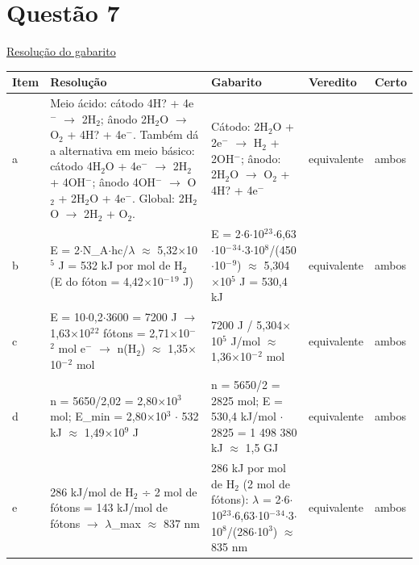 \documentclass{article}%
\begin{document}
\section*{Questão 7}%
\href{https://poliedroresolve.sistemapoliedro.com.br/vestibulares/ita/2026/ita-2-fase-dia-2-29-10-2025-2-fase-dia-2/dissertativa-7-quimica-2-fase-dia-2-ita-2026}{Resolução do gabarito}\par\smallskip%
\begin{longtable}{@{}p{} p{} p{} p{} p{}@{}}\toprule Item & Resolução & Gabarito & Veredito & Certo \\ \midrule
a & Meio ácido: cátodo 4H? + 4e$^{-}$ $\to$ 2H$_{2}$; ânodo 2H$_{2}$O $\to$ O$_{2}$ + 4H? + 4e$^{-}$. Também dá a alternativa em meio básico: cátodo 4H$_{2}$O + 4e$^{-}$ $\to$ 2H$_{2}$ + 4OH$^{-}$; ânodo 4OH$^{-}$ $\to$ O$_{2}$ + 2H$_{2}$O + 4e$^{-}$. Global: 2H$_{2}$O $\to$ 2H$_{2}$ + O$_{2}$. & Cátodo: 2H$_{2}$O + 2e$^{-}$ $\to$ H$_{2}$ + 2OH$^{-}$; ânodo: 2H$_{2}$O $\to$ O$_{2}$ + 4H? + 4e$^{-}$ & equivalente & ambos \\
b & E = 2$\cdot$N\_A$\cdot$hc/$\lambda$ $\approx$ 5,32$\times$10$^{5}$ J = 532 kJ por mol de H$_{2}$ (E do fóton = 4,42$\times$10$^{-}$$^{1}$$^{9}$ J) & E = 2$\cdot$6$\cdot$10$^2$$^3$$\cdot$6,63$\cdot$10$^{-}$$^3$$^{4}$$\cdot$3$\cdot$10$^{8}$/(450$\cdot$10$^{-}$$^{9}$) $\approx$ 5,304$\times$10$^{5}$ J = 530,4 kJ & equivalente & ambos \\
c & E = 10$\cdot$0,2$\cdot$3600 = 7200 J $\to$ 1,63$\times$10$^2$$^2$ fótons = 2,71$\times$10$^{-}$$^2$ mol e$^{-}$ $\to$ n(H$_{2}$) $\approx$ 1,35$\times$10$^{-}$$^2$ mol & 7200 J / 5,304$\times$10$^{5}$ J/mol $\approx$ 1,36$\times$10$^{-}$$^2$ mol & equivalente & ambos \\
d & n = 5650/2,02 = 2,80$\times$10$^3$ mol; E\_min = 2,80$\times$10$^3$ $\cdot$ 532 kJ $\approx$ 1,49$\times$10$^{9}$ J & n = 5650/2 = 2825 mol; E = 530,4 kJ/mol $\cdot$ 2825 = 1 498 380 kJ $\approx$ 1,5 GJ & equivalente & ambos \\
e & 286 kJ/mol de H$_{2}$ ÷ 2 mol de fótons = 143 kJ/mol de fótons $\to$ $\lambda$\_max $\approx$ 837 nm & 286 kJ por mol de H$_{2}$ (2 mol de fótons): $\lambda$ = 2$\cdot$6$\cdot$10$^2$$^3$$\cdot$6,63$\cdot$10$^{-}$$^3$$^{4}$$\cdot$3$\cdot$10$^{8}$/(286$\cdot$10$^3$) $\approx$ 835 nm & equivalente & ambos \\
\bottomrule\end{longtable}%
\end{document}
